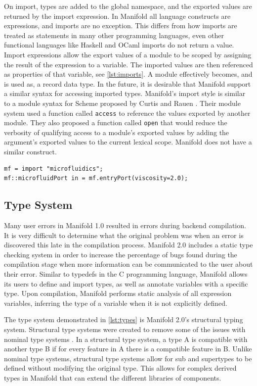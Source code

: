 On import, types are added to the global namespace, and the exported values are returned by the import
expression. In Manifold all language constructs are
expressions, and imports are no exception. This differs from how imports are
treated as statements in many other
programming languages, even other functional languages like Haskell and
OCaml imports do not return a value.  Import expressions allow the
export values of a module to be scoped by assigning the result of the expression
to a variable. The imported values are then referenced as properties of that
variable, see \autoref{lst:imports}. A module effectively becomes, and is used as,
a record data type. In the future, it is desirable that Manifold support a
similar syntax for accessing imported types.
Manifold's import style is similar to a module syntax for Scheme proposed by
Curtis and Rauen \cite{Curtis:1990:MSS:91556.91573}. Their module system used
a function called \texttt{access} to reference the values exported by another
module. They also proposed a function called \texttt{open} that would reduce
the verbosity of qualifying access to a module's exported values by adding the
argument's exported values to the current lexical scope. Manifold does not
have a similar construct.

\begin{lstlisting}[label=lst:imports, caption=A module imported into a Manifold file]
mf = import "microfluidics";
mf::microfluidPort in = mf.entryPort(viscosity=2.0);
\end{lstlisting}

\subsection{Type System}

Many user errors in Manifold 1.0 resulted in errors during backend compilation. It is very difficult
to determine what the original problem was when an error is discovered this late in the compilation
process. Manifold 2.0 includes a static type checking system in order to increase the percentage of bugs found during
the compilation stage when more information can be communicated to the user about their error.
Similar to typedefs in the C programming language, Manifold allows its users to define and import types,
as well as annotate variables with a specific type. Upon compilation,
Manifold performs static analysis of all expression variables, inferring the type of a variable when it
is not explicitly defined.

The type system demonstrated in \autoref{lst:types} is Manifold 2.0's structural typing system.
Structural type systems were
created to remove some of the issues with nominal type systems
\cite{Gil:2008:WIS:1449764.1449771}. In a structural
type system, a type A is compatible with another type B if for every feature in
A there is a compatible feature in B. Unlike nominal type systems, structural
type systems allow for sub and supertypes to be defined without
modifying the original type. This allows for complex derived types in Manifold that
can extend the different libraries of components.

